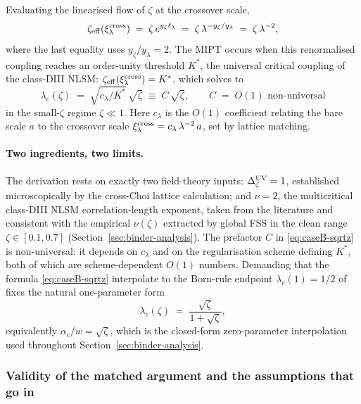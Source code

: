 Evaluating the linearised flow of $\zeta$ at the crossover scale,
\begin{equation}\label{eq:zeta-eff}
  \zeta_{\rm eff}(\xi_\lambda^{\rm cross})
  \;=\;
  \zeta\,e^{y_\zeta\ell_\lambda}
  \;=\;
  \zeta\,\lambda^{-y_\zeta/y_\lambda}
  \;=\;
  \zeta\,\lambda^{-2},
\end{equation}
where the last equality uses $y_\zeta/y_\lambda=2$.  The MIPT occurs
when this renormalised coupling reaches an order-unity threshold
$K^\ast$, the universal critical coupling of the class-DIII NLSM:
$\zeta_{\rm eff}(\xi_\lambda^{\rm cross})=K^\ast$, which solves to
\begin{equation}\label{eq:caseB-sqrtz}
  \boxed{\quad
  \lambda_c(\zeta)\;=\;\sqrt{c_\lambda/K^\ast}\,\sqrt{\zeta}
  \;\equiv\;C\,\sqrt{\zeta},
  \qquad
  C \;=\; O(1) \text{ non-universal}
  \quad}
\end{equation}
in the small-$\zeta$ regime $\zeta\ll 1$.  Here $c_\lambda$ is the
$O(1)$ coefficient relating the bare scale $a$ to the crossover scale
$\xi_\lambda^{\rm cross}=c_\lambda\,\lambda^{-2}\,a$, set by lattice
matching.

\paragraph{Two ingredients, two limits.}
The derivation rests on exactly two field-theory inputs:
$\Delta_\zeta^{\rm UV}=1$, established microscopically by the
cross-Choi lattice calculation; and $\nu=2$, the multicritical
class-DIII NLSM correlation-length exponent, taken from the literature
and consistent with the empirical $\nu(\zeta)$ extracted by global FSS
in the clean range $\zeta\in[0.1,0.7]$ (Section~\ref{sec:binder-analysis}).
The prefactor $C$ in \eqref{eq:caseB-sqrtz} is non-universal: it
depends on $c_\lambda$ and on the regularisation scheme defining
$K^\ast$, both of which are scheme-dependent $O(1)$ numbers.  Demanding
that the formula \eqref{eq:caseB-sqrtz} interpolate to the Born-rule
endpoint $\lambda_c(1)=1/2$ of~\cite{Carollo2018PRA} fixes the natural
one-parameter form
\begin{equation}\label{eq:lambda-c-full}
  \lambda_c(\zeta)\;=\;\frac{\sqrt{\zeta}}{1+\sqrt{\zeta}},
\end{equation}
equivalently $\alpha_c/w=\sqrt{\zeta}$, which is the closed-form
zero-parameter interpolation used throughout
Section~\ref{sec:binder-analysis}.

\subsubsection{Validity of the matched argument and the assumptions
               that go in}
\label{subsubsec:validity}

